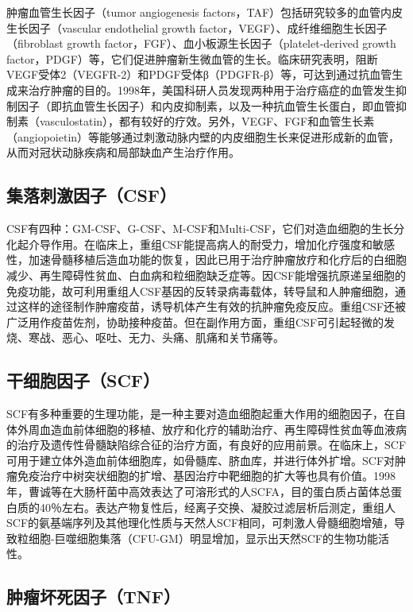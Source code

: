 肿瘤血管生长因子（tumor angiogenesis
factors，TAF）包括研究较多的血管内皮生长因子（vascular endothelial
growth factor，VEGF）、成纤维细胞生长因子（fibroblast growth
factor，FGF）、血小板源生长因子（platelet-derived growth
factor，PDGF）等，它们促进肿瘤新生微血管的生长。临床研究表明，阻断VEGF受体2（VEGFR-2）和PDGF受体β（PDGFR-β）等，可达到通过抗血管生成来治疗肿瘤的目的。1998年，美国科研人员发现两种用于治疗癌症的血管发生抑制因子（即抗血管生长因子）和内皮抑制素，以及一种抗血管生长蛋白，即血管抑制素（vasculostatin），都有较好的疗效。另外，VEGF、FGF和血管生长素（angiopoietin）等能够通过刺激动脉内壁的内皮细胞生长来促进形成新的血管，从而对冠状动脉疾病和局部缺血产生治疗作用。


\subsection{集落刺激因子（CSF）}

CSF有四种：GM-CSF、G-CSF、M-CSF和Multi-CSF，它们对造血细胞的生长分化起介导作用。在临床上，重组CSF能提高病人的耐受力，增加化疗强度和敏感性，加速骨髓移植后造血功能的恢复，因此已用于治疗肿瘤放疗和化疗后的白细胞减少、再生障碍性贫血、白血病和粒细胞缺乏症等。因CSF能增强抗原递呈细胞的免疫功能，故可利用重组人CSF基因的反转录病毒载体，转导鼠和人肿瘤细胞，通过这样的途径制作肿瘤疫苗，诱导机体产生有效的抗肿瘤免疫反应。重组CSF还被广泛用作疫苗佐剂，协助接种疫苗。但在副作用方面，重组CSF可引起轻微的发烧、寒战、恶心、呕吐、无力、头痛、肌痛和关节痛等。


\subsection{干细胞因子（SCF）}

SCF有多种重要的生理功能，是一种主要对造血细胞起重大作用的细胞因子，在自体外周血造血前体细胞的移植、放疗和化疗的辅助治疗、再生障碍性贫血等血液病的治疗及遗传性骨髓缺陷综合征的治疗方面，有良好的应用前景。在临床上，SCF可用于建立体外造血前体细胞库，如骨髓库、脐血库，并进行体外扩增。SCF对肿瘤免疫治疗中树突状细胞的扩增、基因治疗中靶细胞的扩大等也具有价值。1998年，曹诚等在大肠杆菌中高效表达了可溶形式的人SCFA，目的蛋白质占菌体总蛋白质的40％左右。表达产物复性后，经离子交换、凝胶过滤层析后测定，重组人SCF的氨基端序列及其他理化性质与天然人SCF相同，可刺激人骨髓细胞增殖，导致粒细胞-巨噬细胞集落（CFU-GM）明显增加，显示出天然SCF的生物功能活性。


\subsection{肿瘤坏死因子（TNF）}

